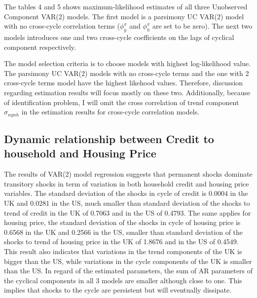 \documentclass[
  12pt,
]{article}
\begin{document}
        \clearpage
        
            
        The tables 4 and 5 shows maximum-likelihood estimates of all three Unobserved Component VAR(2) models. The first model is a parsimony UC VAR(2) model with no cross-cycle correlation terms ($\phi^x_y$ and $\phi^x_h$ are set to be zero). The next two models introduces one and two cross-cycle coefficients on the lags of cyclical component respectively. 
        
        The model selection criteria is to choose models with highest log-likelihood value. The parsimony UC VAR(2) models with no cross-cycle terms and the one with 2 cross-cycle terms model have the highest likehood values. Therefore, discussion regarding estimation results will focus mostly on these two. Additionally, because of identification problem, I will omit the cross correlation of trend component $\sigma_{nynh}$ in the estimation results for cross-cycle correlation models.
        
        \subsection{Dynamic relationship between Credit to household and Housing Price}
        
        The results of VAR(2) model regression suggests that permanent shocks dominate transitory shocks in term of variation in both household credit and housing price variables. The standard deviation of the shocks in cycle of credit is 0.0004 in the UK and 0.0281 in the US, much smaller than standard deviation of the shocks to trend of credit in the UK of 0.7063 and in the US of 0.4793. The same applies for housing price, the standard deviation of the shocks in cycle of housing price is 0.6568 in the UK and 0.2566 in the US, smaller than standard deviation of the shocks to trend of housing price in the UK of 1.8676 and in the US of 0.4549. This result also indicates that variations in the trend components of the UK is bigger than the US, while variations in the cycle components of the UK is smaller than the US. In regard of the estimated parameters, the sum of AR parameters of the cyclical components in all 3 models are smaller although close to one. This implies that shocks to the cycle are persistent but will eventually dissipate.
        
\end{document}
